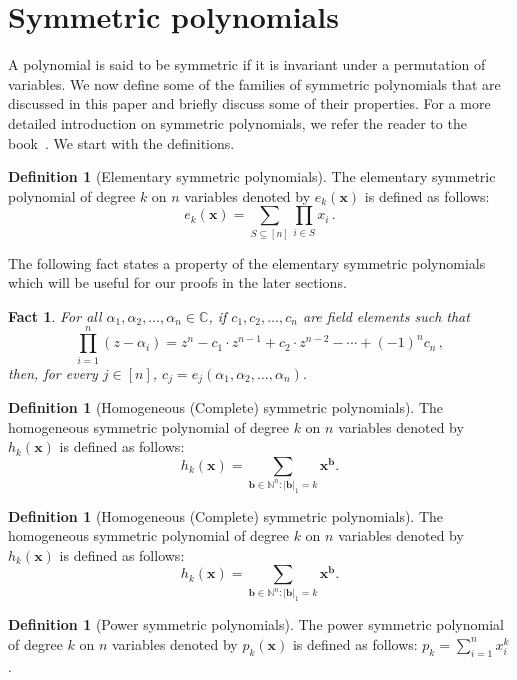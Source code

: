 \documentclass[10pt,a4paper]{article}
\newtheorem{fact}[theorem]{Fact}
\theoremstyle{definition}
\newtheorem{definition}[theorem]{Definition}
\newcommand{\F}{\mathbb C}
\newcommand{\N}{\mathbb N}
\newcommand{\vb}{\mathbf b}
\newcommand{\vx}{\mathbf x}
\begin{document}
\section{Symmetric polynomials}
\label{sec:prelim-sym-poly}
A polynomial is said to be symmetric if it is invariant under a permutation of variables. We now define some of the families of symmetric polynomials that are discussed in this paper and briefly discuss some of their properties. For a more detailed introduction on symmetric polynomials, we refer the reader to the book~\cite{r28}. We start with the definitions.
\begin{definition}[Elementary symmetric polynomials]\label{def:esym}
The elementary symmetric polynomial of degree $k$ on $n$ variables denoted by $e_k(\vx)$ is defined as follows:
\[
e_k(\vx) = \sum_{S\subseteq [n]} \prod_{i \in S} x_i \, .
\]
\end{definition}
The following fact states a property of the elementary symmetric polynomials which will be useful for our proofs in the later sections. 
\begin{fact}\label{fact:esym and roots}
For all $\alpha_1, \alpha_2, \ldots, \alpha_n \in \F$, if $c_1, c_2, \ldots, c_n$ are field elements such that \[
\prod_{i = 1}^n (z-\alpha_i) = z^{n} - c_1\cdot z^{n-1} + c_2\cdot z^{n-2}- \cdots + (-1)^{n} c_n \, ,
\]
then, for every $j \in [n]$, $c_j = e_j(\alpha_1, \alpha_2, \ldots, \alpha_n)$.
\end{fact}

\begin{definition}[Homogeneous (Complete) symmetric polynomials] The homogeneous symmetric polynomial of degree $k$ on $n$ variables denoted by $h_k(\vx)$ is defined as follows:
	$$h_k(\vx)=\sum_{\vb \in \N^n: |\vb|_1 = k} \vx^\vb.$$ 
\end{definition}

\begin{definition}[Homogeneous (Complete) symmetric polynomials] The homogeneous symmetric polynomial of degree $k$ on $n$ variables denoted by $h_k(\vx)$ is defined as follows:
	$$h_k(\vx)=\sum_{\vb \in \N^n: |\vb|_1 = k} \vx^\vb.$$ 
\end{definition}

\begin{definition}[Power symmetric polynomials] The power symmetric polynomial of degree $k$ on $n$ variables denoted by $p_k(\vx)$ is defined as follows:
	$p_k= \sum_{i=1}^n  x_i^k$.
\end{definition}
\end{document}
